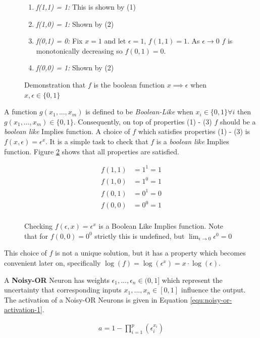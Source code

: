 \begin{figure}[H]
\begin{enumerate}
\item \textit{f(1,1) = 1:} This is shown by (1)
\item \textit{f(1,0) = 1:} Shown by (2)
\item \textit{f(0,1) = 0:} Fix $x = 1$ and let $\epsilon = 1$, $f(1,1) = 1$. As $\epsilon \rightarrow 0 $ $f$ is monotonically decreasing so $f(0,1) = 0$.
\item \textit{f(0,0) = 1:} Shown by (2)
\end{enumerate}
\caption{Demonstration that $f$ is the boolean function $x \implies \epsilon$ when $x,\epsilon \in \{0, 1\}$}
\label{fig:f-actually-implies}
\end{figure}
A function $g(x_1, ..., x_m)$ is defined to be \textit{Boolean-Like} \cite{williams1986logic} when $x_i \in \{0, 1\} \forall i$ then $g(x_1, ..., x_m) \in \{0, 1\}$. Consequently, on top of properties (1) - (3) $f$ should be a \textit{boolean like} Implies function. A choice of $f$ which satisfies properties (1) - (3) is $f(x, \epsilon) = \epsilon^x$. It is a simple task to check that $f$ is a \textit{boolean like} Implies function. Figure \ref{fig:f-check-implies} shows that all properties are satisfied.

\begin{figure}[H]
\begin{align*}
f(1,1) &= 1^1 = 1\\
f(1,0) &= 1^0 = 1\\
f(0,1) &= 0^1 = 0\\
f(0,0) &= 0^0 = 1\\
\end{align*}
\caption{Checking $f(\epsilon, x) = \epsilon^x$ is a Boolean Like Implies function. Note that for $f(0,0) = 0^0$ strictly this is undefined, but $\lim_{\epsilon \rightarrow 0} \epsilon^0 = 0$}
\label{fig:f-check-implies}
\end{figure}

This choice of $f$ is not a unique solution, but it has a property which becomes convenient later on, specifically $\log(f) = \log(\epsilon^x) = x \cdot \log(\epsilon)$.

\begin{definition}
	A \textbf{Noisy-OR} Neuron has weights $\epsilon_1, ..., \epsilon_n \in (0,1]$ which represent the uncertainty that corresponding inputs $x_1, ..., x_n \in [0,1]$ influence the output. The activation of a Noisy-OR Neurons is given in Equation \ref{equ:noisy-or-activation-1}.
	
	\begin{align}
	a = 1 - \prod^p_{i=1} (\epsilon_i^{x_i})
	\label{equ:noisy-or-activation-1}
	\end{align}
\end{definition}

